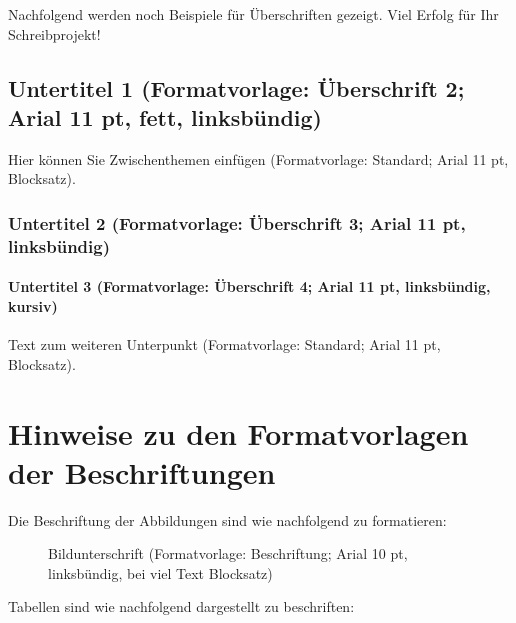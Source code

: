 Nachfolgend werden noch Beispiele für Überschriften gezeigt. Viel Erfolg für Ihr Schreibprojekt!

\subsection{Untertitel 1 (Formatvorlage: Überschrift 2; Arial 11 pt, fett, linksbündig)}

Hier können Sie Zwischenthemen einfügen (Formatvorlage: Standard; Arial 11 pt, Blocksatz).


\subsubsection{Untertitel 2 (Formatvorlage: Überschrift 3; Arial 11 pt, linksbündig)}


\paragraph{Untertitel 3 (Formatvorlage: Überschrift 4; Arial 11 pt, linksbündig, kursiv)}

Text zum weiteren Unterpunkt (Formatvorlage: Standard; Arial 11 pt, Blocksatz).

\section{Hinweise zu den Formatvorlagen der Beschriftungen}

Die Beschriftung der Abbildungen sind wie nachfolgend zu formatieren:

\begin{figure}
	\caption{Bildunterschrift (Formatvorlage: Beschriftung; Arial 10 pt, linksbündig, bei viel Text Blocksatz)}
\end{figure}

Tabellen sind wie nachfolgend dargestellt zu beschriften:

\begin{table}
	\caption{Tabellenunterschrift (Formatvorlage: Beschriftung; Arial 10 pt, linksbündig, bei viel Text Blocksatz)}
\end{table}

%
\printbibliography


